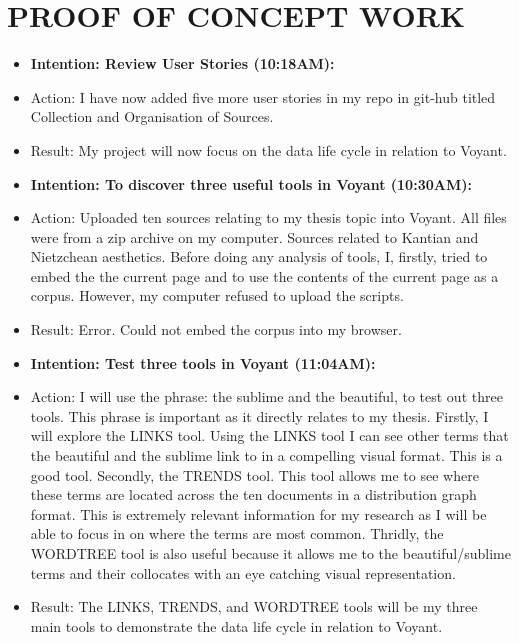 \documentclass[a4paper,12pt]{article}
\begin{document}
\section{PROOF OF CONCEPT WORK}


\begin{itemize} 

\item \textbf{Intention: Review User Stories (10:18AM):}

\item Action: I have now added five more user stories in my repo in git-hub titled Collection and Organisation of Sources.

\item Result: My project will now focus on the data life cycle in relation to Voyant. 


\item \textbf{Intention: To discover three useful tools in Voyant (10:30AM):}


\item Action: Uploaded ten sources relating to my thesis topic into Voyant. All files were from a zip archive on my computer. Sources related to Kantian and Nietzchean aesthetics. Before doing any analysis of tools, I, firstly, tried to embed the the current page and to use the contents of the current page as a corpus. However, my computer refused to upload the scripts. 


\item Result: Error. Could not embed the corpus into my browser. 


\item \textbf{Intention: Test three tools in Voyant (11:04AM):}


\item Action: I will use the phrase: the sublime and the beautiful, to test out three tools. This phrase is important as it directly relates to my thesis. Firstly, I will explore the LINKS tool. Using the LINKS tool I can see other terms that the beautiful and the sublime link to in a compelling visual format. This is a good tool. Secondly, the TRENDS tool. This tool allows me to see where these terms are located across the ten documents in a distribution graph format. This is extremely relevant information for my research as I will be able to focus in on where the terms are most common. Thridly, the WORDTREE tool is also useful because it allows me to the beautiful/sublime terms and their collocates with an eye catching visual representation. 


\item Result: The LINKS, TRENDS, and WORDTREE tools will be my three main tools to demonstrate the data life cycle in relation to Voyant. 



\end{itemize}
\end{document}
